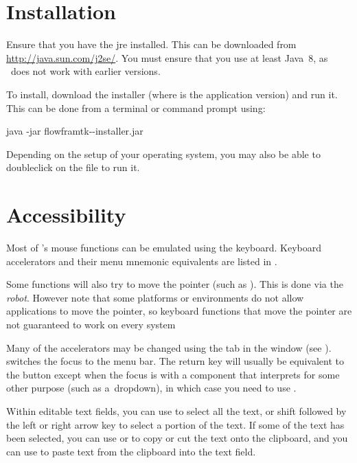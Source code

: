 \chapter{Installation}
\label{sec:install}

Ensure that you have the \gls{jre} installed.
This can be downloaded from \url{http://java.sun.com/j2se/}.
You must ensure that you use at least Java~8, as \FlowframTk\
does not work with earlier versions.

To install, download the installer
(where  is the application version) and run it. 
This can be done from a terminal or command prompt using:

\begin{terminal}
java -jar flowframtk--installer.jar
\end{terminal}

Depending on the setup of your operating system, you may also be
able to \gls{doubleclick} on the \ext{jar} file to run it.


\chapter{Accessibility}
\label{sec:access}

Most of \FlowframTk's mouse functions can be emulated using the
keyboard. Keyboard accelerators and
their menu mnemonic equivalents are listed in .

\begin{information}
Some functions will also try to move the pointer (such as
). This is done via the \emph{\gls{robot}}.
However note that some platforms or environments do not allow applications
to move the pointer, so keyboard functions that move the pointer are
not guaranteed to work on every system
\end{information}

Many of the accelerators may be changed using the 
tab in the \dialog{configui} window (see
).  
switches the focus to the menu bar. The return 
key will usually be equivalent to the \widget{okay} button
except when the focus is with a component that interprets
 for some other purpose (such as
a~\gls{dropdown}), in which case you need to use .

Within editable text fields, you can use  to
select all the text, or shift \keys{\keyref{shift}} followed by
the left  or right  arrow
key to select a portion of the text. If some of the text has been
selected, you can use \keys{\keyref{ctrl}+C} or
 to copy or cut the text onto the clipboard,
and you can use \keys{\keyref{ctrl}+V} to paste text from the
clipboard into the text field.

